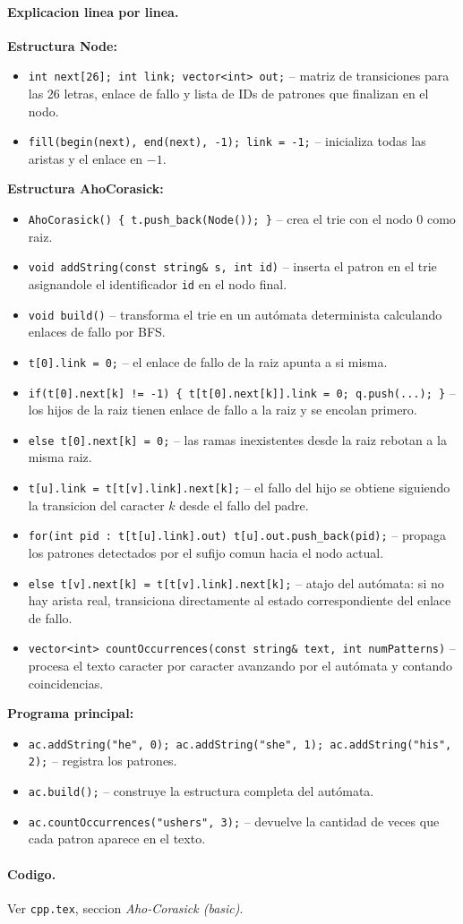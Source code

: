 \paragraph{Explicacion linea por linea.}
\textbf{Estructura Node:}
\begin{itemize}\setlength\itemsep{0pt}
	\item \verb|int next[26]; int link; vector<int> out;| -- matriz de transiciones para las 26 letras, enlace de fallo y lista de IDs de patrones que finalizan en el nodo.
	\item \verb|fill(begin(next), end(next), -1); link = -1;| -- inicializa todas las aristas y el enlace en $-1$.
\end{itemize}
\textbf{Estructura AhoCorasick:}
\begin{itemize}\setlength\itemsep{0pt}
	\item \verb|AhoCorasick() { t.push_back(Node()); }| -- crea el trie con el nodo 0 como raiz.
	\item \verb|void addString(const string& s, int id)| -- inserta el patron en el trie asignandole el identificador \verb|id| en el nodo final.
	\item \verb|void build()| -- transforma el trie en un autómata determinista calculando enlaces de fallo por BFS.
	\item \verb|t[0].link = 0;| -- el enlace de fallo de la raiz apunta a si misma.
	\item \verb|if(t[0].next[k] != -1) { t[t[0].next[k]].link = 0; q.push(...); }| -- los hijos de la raiz tienen enlace de fallo a la raiz y se encolan primero.
	\item \verb|else t[0].next[k] = 0;| -- las ramas inexistentes desde la raiz rebotan a la misma raiz.
	\item \verb|t[u].link = t[t[v].link].next[k];| -- el fallo del hijo se obtiene siguiendo la transicion del caracter $k$ desde el fallo del padre.
	\item \verb|for(int pid : t[t[u].link].out) t[u].out.push_back(pid);| -- propaga los patrones detectados por el sufijo comun hacia el nodo actual.
	\item \verb|else t[v].next[k] = t[t[v].link].next[k];| -- atajo del autómata: si no hay arista real, transiciona directamente al estado correspondiente del enlace de fallo.
	\item \verb|vector<int> countOccurrences(const string& text, int numPatterns)| -- procesa el texto caracter por caracter avanzando por el autómata y contando coincidencias.
\end{itemize}
\textbf{Programa principal:}
\begin{itemize}\setlength\itemsep{0pt}
	\item \verb|ac.addString("he", 0); ac.addString("she", 1); ac.addString("his", 2);| -- registra los patrones.
	\item \verb|ac.build();| -- construye la estructura completa del autómata.
	\item \verb|ac.countOccurrences("ushers", 3);| -- devuelve la cantidad de veces que cada patron aparece en el texto.
\end{itemize}

\paragraph{Codigo.}
Ver \texttt{cpp.tex}, seccion \textit{Aho-Corasick (basic)}.

\vspace{0.5em}
